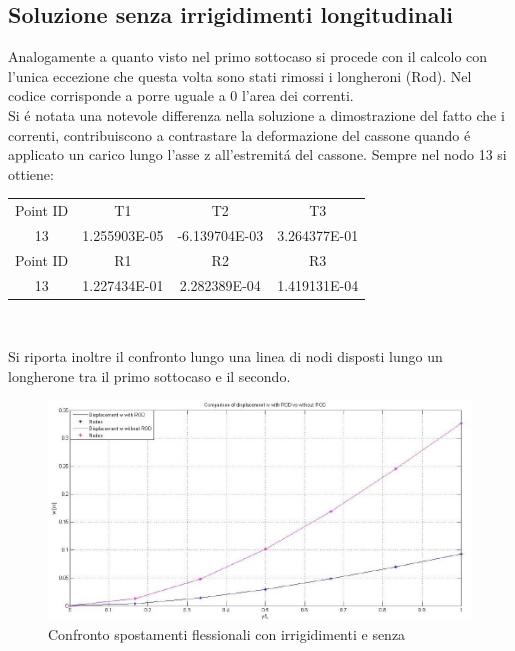 \documentclass[12pt,a4paper]{article}
\begin{document}
\subsection{Soluzione senza irrigidimenti longitudinali}
Analogamente a quanto visto nel primo sottocaso si procede con il calcolo con l'unica eccezione che questa volta sono stati rimossi i longheroni
(Rod). Nel codice corrisponde a porre uguale a 0 l'area dei correnti.\\
Si \'e notata una notevole differenza nella soluzione a dimostrazione del fatto che i correnti, contribuiscono a contrastare la deformazione del
cassone quando \'e applicato un carico lungo l'asse z all'estremit\'a del cassone. Sempre nel nodo 13 si ottiene:\\
\begin{center}
\begin{tabular}{c c c c}
\hline
Point ID& T1 & T2 & T3\\
13 & 1.255903E-05 & -6.139704E-03 & 3.264377E-01\\
\hline
Point ID & R1 & R2 & R3\\
13 & 1.227434E-01 & 2.282389E-04 & 1.419131E-04\\
\hline
\end{tabular}\\ 
\end{center}
Si riporta inoltre il confronto lungo una linea di nodi disposti lungo un longherone tra  il primo sottocaso e il secondo.\\
\begin{figure}[htbp]
\centering
\includegraphics[width=150mm]{Immagini/confrontorod}
\caption{Confronto spostamenti flessionali con irrigidimenti e senza}
\end{figure}\\
\end{document}
